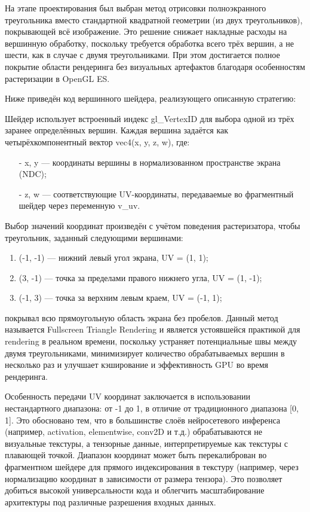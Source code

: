 \documentclass[a4paper,14pt]{extreport}
\begin{document}
            На этапе проектирования был выбран метод отрисовки полноэкранного треугольника вместо стандартной квадратной геометрии (из двух треугольников), покрывающей всё изображение. Это решение снижает накладные расходы на вершинную обработку, поскольку требуется обработка всего трёх вершин, а не шести, как в случае с двумя треугольниками. При этом достигается полное покрытие области рендеринга без визуальных артефактов благодаря особенностям растеризации в OpenGL ES.
            
            Ниже приведён код вершинного шейдера, реализующего описанную стратегию:
            

            Шейдер использует встроенный индекс gl\_VertexID для выбора одной из трёх заранее определённых вершин. Каждая вершина задаётся как четырёхкомпонентный вектор vec4(x, y, z, w), где:
            \begin{itemize}
                \item[-] x, y — координаты вершины в нормализованном пространстве экрана (NDC);
                \item[-] z, w — соответствующие UV-координаты, передаваемые во фрагментный шейдер через переменную v\_uv.
            \end{itemize}
            
            Выбор значений координат произведён с учётом поведения растеризатора, чтобы треугольник, заданный следующими вершинами:
            \begin{enumerate}
                \item (-1, -1) — нижний левый угол экрана, UV = (1, 1);
                \item (3, -1) — точка за пределами правого нижнего угла, UV = (1, -1);
                \item (-1, 3) — точка за верхним левым краем, UV = (-1, 1);
            \end{enumerate}
            покрывал всю прямоугольную область экрана без пробелов. Данный метод называется Fullscreen Triangle Rendering и является устоявшейся практикой для rendering в реальном времени, поскольку устраняет потенциальные швы между двумя треугольниками, минимизирует количество обрабатываемых вершин в несколько раз и улучшает кэширование и эффективность GPU во время рендеринга.

            Особенность передачи UV координат заключается в использовании нестандартного диапазона: от -1 до 1, в отличие от традиционного диапазона [0, 1]. Это обосновано тем, что в большинстве слоёв нейросетевого инференса (например, activation, elementwise, conv2D и т.д.) обрабатываются не визуальные текстуры, а тензорные данные, интерпретируемые как текстуры с плавающей точкой. Диапазон координат может быть перекалиброван во фрагментном шейдере для прямого индексирования в текстуру (например, через нормализацию координат в зависимости от размера тензора). Это позволяет добиться высокой универсальности кода и облегчить масштабирование архитектуры под различные разрешения входных данных.
            
\end{document}
